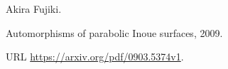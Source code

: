 Akira Fujiki.

\newblock Automorphisms of parabolic {Inoue} surfaces, 2009.

\newblock URL \url{https://arxiv.org/pdf/0903.5374v1}.

